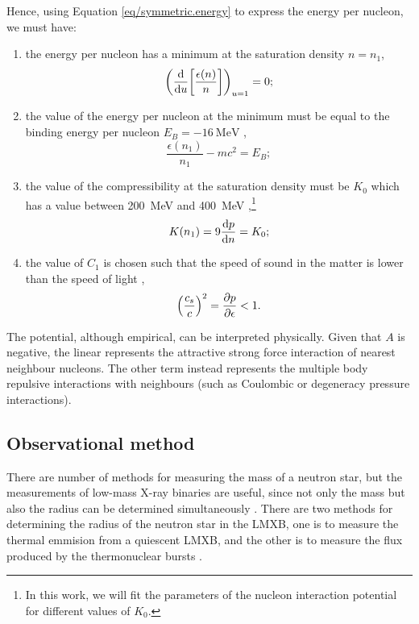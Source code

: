 \documentclass[draft,11pt]{article}
\theoremstyle{definition}
\theoremstyle{remark}
\begin{document}
                Hence, using Equation \ref{eq/symmetric.energy} to express the energy per nucleon, we must have:
                \begin{enumerate}
                    \item the energy per nucleon has a minimum at the saturation density $n=n_{1}$, \[\qty(\dv{u}\qty[\frac{\epsilon(n)}{n}])_{u=1}=0;\]
                    \item the value of the energy per nucleon at the minimum must be equal to the binding energy per nucleon $E_{B}=-\SI{16}{\mega\electronvolt}$ \parencite{silbar.reddy.2004/neutron.stars}, \[\frac{\epsilon(n_{1})}{n_{1}}-mc^{2}=E_{B};\]
                    \item the value of the compressibility at the saturation density must be $K_{0}$ which has a value between \SI{200}{\mega\electronvolt} and \SI{400}{\mega\electronvolt} \parencite{silbar.reddy.2004/neutron.stars},\footnote{In this work, we will fit the parameters of the nucleon interaction potential for different values of $K_{0}$.} \[K(n_{1})=9\dv{p}{n}=K_{0};\]
                    \item the value of $C_{1}$ is chosen such that the speed of sound in the matter is lower than the speed of light \parencite{bludman.dover.1980/extrapolation.skyrme.eos}, \[\qty(\frac{c_{s}}{c})^{2}=\pdv{p}{\epsilon}<1.\]
                \end{enumerate}

                The potential, although empirical, can be interpreted physically. Given that $A$ is negative, the linear represents the attractive strong force interaction of nearest neighbour nucleons. The other term instead represents the multiple body repulsive interactions with neighbours \parencite{bludman.dover.1980/extrapolation.skyrme.eos} (such as Coulombic or degeneracy pressure interactions).
            
        \subsection{Observational method}
            There are number of methods for measuring the mass of a neutron star, but the measurements of low-mass X-ray binaries are useful, since not only the mass but also the radius can be determined simultaneously \parencite{ozel.paulo.2016/masses.radii.eos}. There are two methods for determining the radius of the neutron star in the LMXB, one is to measure the thermal emmision from a quiescent LMXB, and the other is to measure the flux produced by the thermonuclear bursts \parencite{ozel.paulo.2016/masses.radii.eos}.
            
\end{document}

